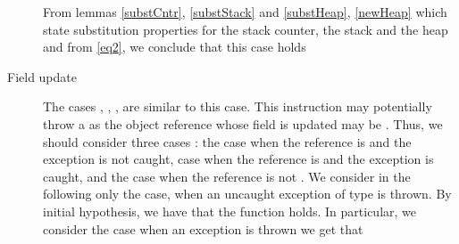\begin{description}
		       From lemmas \ref{substCntr},  \ref{substStack} and \ref{substHeap}, \ref{newHeap} which state substitution properties for 
		       the stack counter, the stack and the heap and from  \eqref{eq2}, we conclude that this case holds

		
\item [Field update] 
                The cases \getfield, \arrstore, \arrload,  \arraylength{} are similar to this case.
		This instruction may potentially throw a \NullPointerExc{} as the object reference whose field is updated may be \Mynull.
		Thus, we should consider three cases : the case when the reference is \Mynull{} and the \NullPointerExc{} exception is not caught,
		case when the reference is \Mynull{} and the \NullPointerExc{} exception is  caught, and the case when the reference is not \Mynull.
		We consider in the following only the case, when an uncaught exception of type \NullPointerExc{} is thrown. 
		By initial hypothesis, we have that the \wpName{} function holds. In particular, we consider the case when an exception is thrown we get that
		 	

\end{description}
